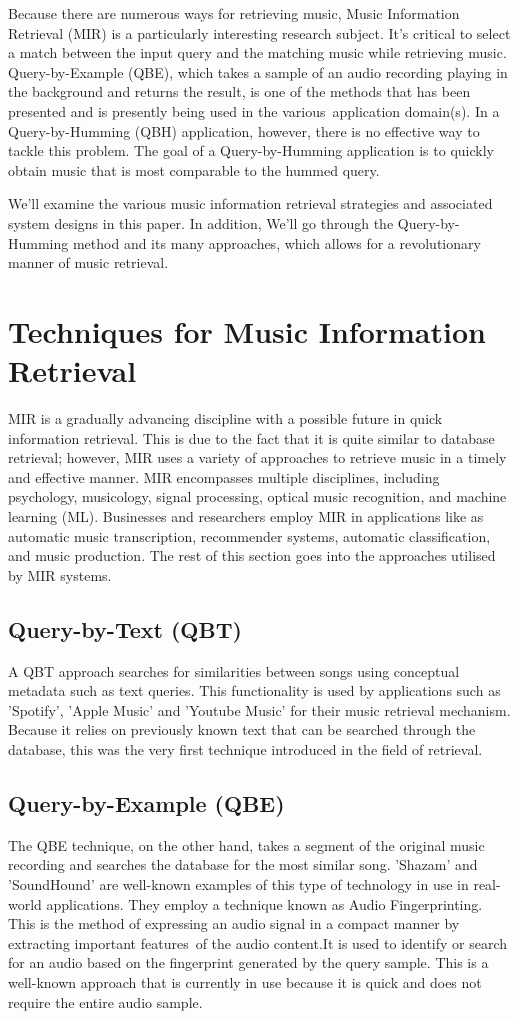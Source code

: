 \documentclass[conference]{IEEEtran}
\begin{document}
Because there are numerous ways for retrieving music, Music Information Retrieval (MIR) is a particularly interesting research subject. It's critical to select a match between the input query and the matching music while retrieving music. Query-by-Example (QBE), which takes a sample of an audio recording playing in the background and returns the result, is one of the methods that has been presented and is presently being used in the various application domain(s). In a Query-by-Humming (QBH) application, however, there is no effective way to tackle this problem. The goal of a Query-by-Humming application is to quickly obtain music that is most comparable to the hummed query.

We'll examine the various music information retrieval strategies and associated system designs in this paper. In addition, We'll go through the Query-by-Humming method and its many approaches, which allows for a revolutionary manner of music retrieval. \cite{b2}

\section{Techniques for Music Information Retrieval}
MIR is a gradually advancing discipline with a possible future in quick information retrieval. This is due to the fact that it is quite similar to database retrieval; however, MIR uses a variety of approaches to retrieve music in a timely and effective manner. MIR encompasses multiple disciplines, including  psychology, musicology, signal processing, optical music recognition, and machine learning (ML). Businesses and researchers employ MIR in applications like as  automatic music transcription, recommender systems, automatic classification, and music production. The rest of this section goes into the approaches utilised by MIR systems.
\subsection{Query-by-Text (QBT)}
A QBT approach searches for similarities between songs using conceptual metadata such as text queries. This functionality is used by applications such as 'Spotify', 'Apple Music' and 'Youtube Music' for their music retrieval mechanism. Because it relies on previously known text that can be searched through the database, this was the very first technique introduced in the field of retrieval.
\subsection{Query-by-Example (QBE)}
The QBE technique, on the other hand, takes a segment of the original music recording and searches the database for the most similar song. 'Shazam' and 'SoundHound' are well-known examples of this type of technology in use in real-world applications. They employ a technique known as Audio Fingerprinting. This is the method of expressing an audio signal in a compact manner by extracting important features of the audio content.It is used to identify or search for an audio based on the fingerprint generated by the query sample. This is a well-known approach that is currently in use because it is quick and does not require the entire audio sample.
\end{document}

